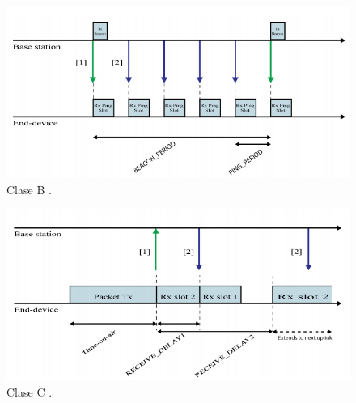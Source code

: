 \begin{figure}[h]
	\centering
	\includegraphics[scale=.65]{./Figures/LoraClaseB.PNG}
	\caption{Clase B \protect\footnotemark.}
	\label{fig:LoraClaseB}
\end{figure}

\begin{figure}[h]
	\centering
	\includegraphics[scale=.65]{./Figures/LoraClaseC.PNG}
	\caption{Clase C \protect\footnotemark.}
	\label{fig:LoraClaseC}
\end{figure}





                                                        
